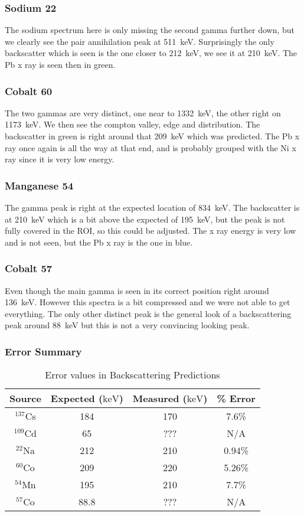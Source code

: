 \documentclass[letterpaper,12pt]{article}
\begin{document}
\subsubsection{Sodium 22}
The sodium spectrum here is only missing the second gamma further down, but we clearly see the pair annihilation peak at \SI{511}{\keV}. Surprisingly the only backscatter which is seen is the one closer to \SI{212}{\keV}, we see it at \SI{210}{\keV}. The Pb x ray is seen then in green.

\subsubsection{Cobalt 60}
The two gammas are very distinct, one near to \SI{1332}{\keV}, the other right on \SI{1173}{\keV}. We then see the compton valley, edge and distribution. The backscatter in green is right around that \SI{209}{\keV} which was predicted. The Pb x ray once again is all the way at that end, and is probably grouped with the Ni x ray since it is very low energy.

\subsubsection{Manganese 54}
The gamma peak is right at the expected location of \SI{834}{\keV}. The backscatter is at \SI{210}{\keV} which is a bit above the expected of \SI{195}{\keV}, but the peak is not fully covered in the ROI, so this could be adjusted. The x ray energy is very low and is not seen, but the Pb x ray is the one in blue.

\subsubsection{Cobalt 57}
Even though the main gamma is seen in its correct position right around \SI{136}{\keV}. However this spectra is a bit compressed and we were not able to get everything. The only other distinct peak is the general look of a backscattering peak around \SI{88}{\keV} but this is not a very convincing looking peak.

\subsubsection{Error Summary}
\begin{table}[H]
\centering
\begin{tabular}{c|c|c|c}
Source & Expected ($\si{\keV}$) & Measured ($\si{\keV}$) & \% Error \\ \hline
$^{137}$Cs & 184 & 170 & 7.6\% \\
$^{109}$Cd & 65 & ??? & N/A \\
$^{22}$Na & 212 & 210 & 0.94\% \\
$^{60}$Co & 209 & 220 & 5.26\% \\
$^{54}$Mn & 195 & 210 & 7.7\% \\
$^{57}$Co & 88.8 & ??? & N/A
\end{tabular}
\caption{Error values in Backscattering Predictions}
\label{tab:err}
\end{table}
\end{document}
